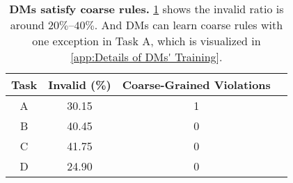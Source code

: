 \begin{table}[]
    \centering
    \caption{\textbf{DMs satisfy coarse rules.} \cref{tab:coarse-grained rule} shows the invalid ratio is around $20\%$–$40\%$. And DMs can learn coarse rules with one exception in Task A, which is visualized in \cref{app:Details of DMs' Training}.}
    \label{tab:coarse-grained rule}
    \begin{tabular}{cccc}
        \toprule
       {Task} & {Invalid (\%)} &  {Coarse-Grained Violations} \\
        \midrule
         A & 30.15 &  1 \\
         B & 40.45 & 0 \\
         C & 41.75 & 0 \\
         D & 24.90 & 0 \\
        \bottomrule
    \end{tabular}
    \vspace{-0.2in}
\end{table}
